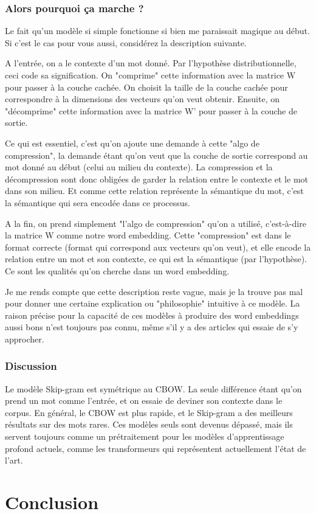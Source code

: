 \documentclass[11pt, a4paper]{report}
\begin{document}
\subsection{Alors pourquoi ça marche ?}
Le fait qu'un modèle si simple fonctionne si bien me paraissait magique au début. Si c'est le 
cas pour vous aussi, considérez la description suivante. 

A l'entrée, on a le contexte d'un mot donné. Par l'hypothèse distributionnelle, ceci code 
sa signification. On "comprime" cette information avec la matrice W pour passer à la couche 
cachée. On choisit la taille de la couche cachée pour correspondre à la dimensions des vecteurs 
qu'on veut obtenir. Ensuite, on "décomprime" cette information avec la matrice W' 
pour passer à la couche de sortie. 

Ce qui est essentiel, c'est qu'on ajoute une demande  
à cette "algo de compression", la demande étant qu'on veut que la couche de sortie 
correspond au mot donné au début (celui au milieu du contexte). La compression et la 
décompression sont donc obligées de garder la relation entre le contexte et le mot dans son 
milieu. Et comme cette relation représente la sémantique du mot, c'est la sémantique qui sera 
encodée dans ce processus. 

A la fin, on prend simplement "l'algo de compression" qu'on a utilisé, c'est-à-dire la matrice 
W comme notre word embedding. Cette "compression" est dans le format correcte (format qui 
correspond aux vecteurs qu'on veut), et elle encode la relation entre un mot et son contexte, 
ce qui est la sémantique (par l'hypothèse). Ce sont les qualités qu'on cherche dans un word 
embedding. 

Je me rends compte que cette description reste vague, mais je la trouve pas mal pour donner une
certaine explication ou "philosophie" intuitive à ce modèle. La raison précise pour la capacité de ces 
modèles à produire des word embeddings aussi bons n'est toujours pas connu, 
même s'il y a des articles qui essaie de s'y approcher. 

\subsection{Discussion}
\cite{wikipedia-wembedding} Le modèle Skip-gram est symétrique au CBOW. La seule différence étant qu'on prend un mot comme l'entrée, 
et on essaie de deviner son contexte dans le corpus. En général, le CBOW est plus rapide, et le 
Skip-gram a des meilleurs résultats sur des mots rares. Ces modèles 
seuls sont devenus dépassé, mais ils servent toujours comme un prétraitement pour les modèles 
d'apprentissage profond actuels, comme les transformeurs qui représentent actuellement l'état 
de l'art.  

\chapter{Conclusion}



\end{document}
